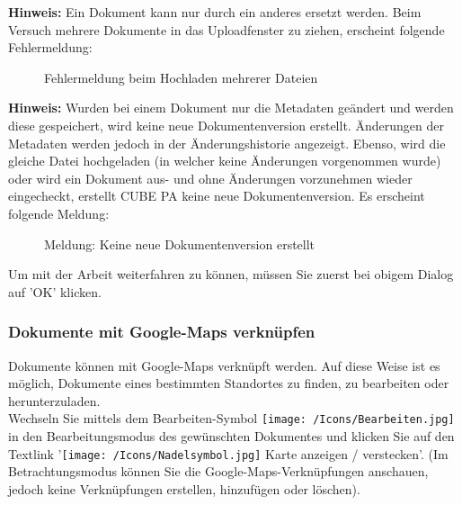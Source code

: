 \textbf{Hinweis:} Ein Dokument kann nur durch ein anderes ersetzt werden. Beim Versuch mehrere Dokumente in das Uploadfenster zu ziehen, erscheint folgende Fehlermeldung:

\begin{figure}[H]
\caption{Fehlermeldung beim Hochladen mehrerer Dateien}
\end{figure}

\textbf{Hinweis:} Wurden bei einem Dokument nur die Metadaten geändert und werden diese gespeichert, wird keine neue Dokumentenversion erstellt. Änderungen der Metadaten werden jedoch in der Änderungshistorie angezeigt. Ebenso, wird die gleiche Datei hochgeladen (in welcher keine Änderungen vorgenommen wurde) oder wird ein Dokument aus- und ohne Änderungen vorzunehmen wieder eingecheckt, erstellt CUBE PA keine neue Dokumentenversion. Es erscheint folgende Meldung:

\begin{figure}[H]
\caption{Meldung: Keine neue Dokumentenversion erstellt}
\end{figure}

Um mit der Arbeit weiterfahren zu können, müssen Sie zuerst bei obigem Dialog auf 'OK' klicken.

\subsubsection{Dokumente mit Google-Maps verknüpfen}
\label{bkm:Ref442545553}
Dokumente können mit Google-Maps verknüpft werden. Auf diese Weise ist es möglich, Dokumente eines bestimmten Standortes zu finden, zu bearbeiten oder herunterzuladen. \\
Wechseln Sie mittels dem Bearbeiten-Symbol \texttt{[image: /Icons/Bearbeiten.jpg]} in den Bearbeitungsmodus des gewünschten Dokumentes und klicken Sie auf den Textlink '\texttt{[image: /Icons/Nadelsymbol.jpg]} \textcolor{NavyBlue}{Karte anzeigen / verstecken}'. (Im Betrachtungsmodus können Sie die Google-Maps-Verknüpfungen anschauen, jedoch keine Verknüpfungen erstellen, hinzufügen oder löschen).

